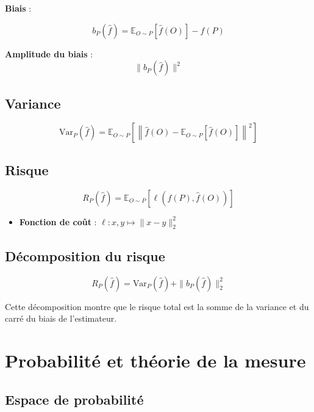 \documentclass{article}
\begin{document}
\textbf{Biais} :

\[
b_P(\hat{f}) = \mathbb{E}_{O \sim P}[\hat{f}(O)] - f(P)
\]

\textbf{Amplitude du biais} : 
\[
\| b_P(\hat{f}) \|^2
\]


\subsection{Variance}

\[
\text{Var}_P(\hat{f}) = \mathbb{E}_{O \sim P} \left[ \left\| \hat{f}(O) - \mathbb{E}_{O \sim P}[\hat{f}(O)] \right\|^2 \right]
\]

\subsection{Risque}

\[
R_P(\hat{f}) = \mathbb{E}_{O \sim P} [ \ell(f(P), \hat{f}(O)) ]
\]

\begin{itemize}
    \item \textbf{Fonction de coût} : $\ell : x, y \mapsto \| x - y \|_2^2$
\end{itemize}

\subsection{Décomposition du risque}

\[
R_P(\hat{f}) = \text{Var}_P(\hat{f}) + \| b_P(\hat{f}) \|_2^2
\]

Cette décomposition montre que le risque total est la somme de la variance et du carré du biais de l'estimateur.

\section{Probabilité et théorie de la mesure}

\subsection{Espace de probabilité}
\end{document}

